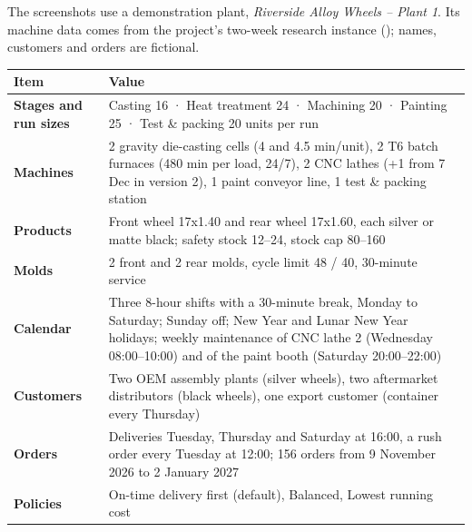The screenshots use a demonstration plant, \textit{Riverside Alloy Wheels -- Plant 1}. Its machine data comes
from the project's two-week research instance (); names, customers and
orders are fictional.

\begin{center}
\begin{tabularx}{\linewidth}{>{\bfseries}p{3.2cm}X}
\toprule
\rowcolor{white}Item & Value \\
\midrule
Stages and run sizes & Casting 16 · Heat treatment 24 · Machining 20 · Painting 25 · Test \& packing 20 units per run \\
Machines & 2 gravity die-casting cells (4 and 4.5 min/unit), 2 T6 batch furnaces (480 min per load, 24/7), 2 CNC lathes (+1 from 7 Dec in version 2), 1 paint conveyor line, 1 test \& packing station \\
Products & Front wheel 17x1.40 and rear wheel 17x1.60, each silver or matte black; safety stock 12--24, stock cap 80--160 \\
Molds & 2 front and 2 rear molds, cycle limit 48 / 40, 30-minute service \\
Calendar & Three 8-hour shifts with a 30-minute break, Monday to Saturday; Sunday off; New Year and Lunar New Year holidays; weekly maintenance of CNC lathe 2 (Wednesday 08:00--10:00) and of the paint booth (Saturday 20:00--22:00) \\
Customers & Two OEM assembly plants (silver wheels), two aftermarket distributors (black wheels), one export customer (container every Thursday) \\
Orders & Deliveries Tuesday, Thursday and Saturday at 16:00, a rush order every Tuesday at 12:00; 156 orders from 9 November 2026 to 2 January 2027 \\
Policies & On-time delivery first (default), Balanced, Lowest running cost \\
\bottomrule
\end{tabularx}
\end{center}
